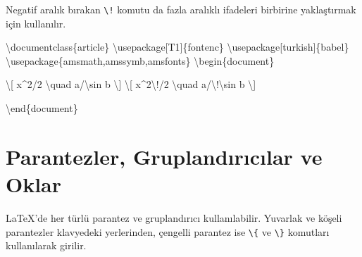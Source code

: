 \documentclass[
  letterpaper,
  DIV=11,
  numbers=noendperiod]{scrreprt}
\newenvironment{Shaded}{\begin{snugshade}}{\end{snugshade}}
\newcommand{\BuiltInTok}[1]{\textcolor[rgb]{0.00,0.23,0.31}{#1}}
\newcommand{\ExtensionTok}[1]{\textcolor[rgb]{0.00,0.23,0.31}{#1}}
\newcommand{\KeywordTok}[1]{\textcolor[rgb]{0.00,0.23,0.31}{#1}}
\newcommand{\NormalTok}[1]{\textcolor[rgb]{0.00,0.23,0.31}{#1}}
\newcommand{\SpecialCharTok}[1]{\textcolor[rgb]{0.37,0.37,0.37}{#1}}
\newcommand{\SpecialStringTok}[1]{\textcolor[rgb]{0.13,0.47,0.30}{#1}}
\begin{document}
Negatif aralık bırakan \texttt{\textbackslash{}!} komutu da fazla
aralıklı ifadeleri birbirine yaklaştırmak için kullanılır.

\begin{Shaded}
\begin{Highlighting}[]
\BuiltInTok{\textbackslash{}documentclass}\NormalTok{\{}\ExtensionTok{article}\NormalTok{\}}
\BuiltInTok{\textbackslash{}usepackage}\NormalTok{[T1]\{}\ExtensionTok{fontenc}\NormalTok{\}}
\BuiltInTok{\textbackslash{}usepackage}\NormalTok{[turkish]\{}\ExtensionTok{babel}\NormalTok{\}}
\BuiltInTok{\textbackslash{}usepackage}\NormalTok{\{}\ExtensionTok{amsmath,amssymb,amsfonts}\NormalTok{\}}
\KeywordTok{\textbackslash{}begin}\NormalTok{\{}\ExtensionTok{document}\NormalTok{\}}

\SpecialStringTok{\textbackslash{}[}
\SpecialStringTok{x\^{}2/2 }\SpecialCharTok{\textbackslash{}quad}\SpecialStringTok{ a/}\SpecialCharTok{\textbackslash{}sin}\SpecialStringTok{ b}
\SpecialStringTok{\textbackslash{}]}
\SpecialStringTok{\textbackslash{}[}
\SpecialStringTok{x\^{}2}\SpecialCharTok{\textbackslash{}!}\SpecialStringTok{/2 }\SpecialCharTok{\textbackslash{}quad}\SpecialStringTok{ a/}\SpecialCharTok{\textbackslash{}!\textbackslash{}sin}\SpecialStringTok{ b}
\SpecialStringTok{\textbackslash{}]}

\KeywordTok{\textbackslash{}end}\NormalTok{\{}\ExtensionTok{document}\NormalTok{\}}
\end{Highlighting}
\end{Shaded}

\hypertarget{parantezler-gruplandux131rux131cux131lar-ve-oklar}{%
\section{Parantezler, Gruplandırıcılar ve
Oklar}\label{parantezler-gruplandux131rux131cux131lar-ve-oklar}}

{\LaTeX}'de her türlü parantez ve gruplandırıcı kullanılabilir. Yuvarlak
ve köşeli parantezler klavyedeki yerlerinden, çengelli parantez ise
\texttt{\textbackslash{}\{} ve \texttt{\textbackslash{}\}} komutları
kullanılarak girilir.

\begin{Shaded}
\end{Shaded}
\end{document}
